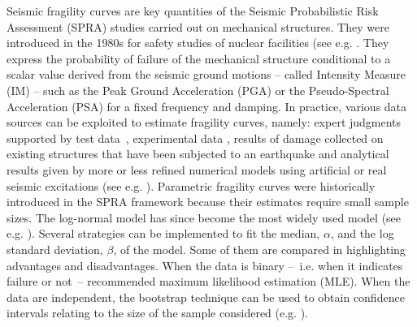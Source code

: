 Seismic fragility curves are key quantities of the Seismic Probabilistic Risk Assessment (SPRA) studies carried out on mechanical structures. They were introduced in the 1980s for safety studies of nuclear facilities (see e.g.
\cite{kennedy_probabilistic_1980,kennedy_seismic_1984,park_survey_1998,kennedy_risk_1999,cornell_hazard_2004}.
They express the probability of failure of the mechanical structure conditional to a scalar value derived from the seismic ground motions -- called Intensity Measure (IM) -- such as the Peak Ground Acceleration (PGA) or the Pseudo-Spectral Acceleration (PSA) for a fixed frequency and damping. In practice, various data sources can be exploited to estimate fragility curves, namely: expert judgments supported by test data \cite{kennedy_probabilistic_1980,kennedy_seismic_1984,park_survey_1998,zentner_fragility_2017}, experimental data \cite{park_survey_1998,gardoni_probabilistic_2002,choe_closed-form_2007}, results of damage collected on existing structures that have been subjected to an earthquake \citep{shinozuka_statistical_2000,lallemant_statistical_2015,straub_improved_2008}  and analytical results given by more or less refined numerical models using artificial or real seismic excitations (see e.g. \cite{zentner_numerical_2010,wang_influence_2020,mandal_seismic_2016,wang_seismic_2018,wang_bayesian_2018,zhao_seismic_2020}). Parametric fragility curves were historically introduced in the SPRA framework because their estimates require small sample sizes. The log-normal model has since become the most widely used model (see e.g. \cite{shinozuka_statistical_2000,lallemant_statistical_2015,straub_improved_2008,zentner_numerical_2010,wang_influence_2020,mandal_seismic_2016,wang_bayesian_2018,wang_seismic_2018,zhao_seismic_2020,ellingwood_earthquake_2001,kim_development_2004,mai_seismic_2017,trevlopoulos_parametric_2019,katayama_bayesian-estimation-based_2021}).
Several strategies can be implemented to fit the median, $\alpha$, and the log standard deviation, $\beta$, of the model. Some of them are compared in \cite{lallemant_statistical_2015} highlighting advantages and disadvantages.
When the data is binary --~i.e. when it indicates failure or not~-- \citet{lallemant_statistical_2015} recommended maximum likelihood estimation (MLE). When the data are independent, the bootstrap technique can be used to obtain confidence intervals relating to the size of the sample considered (e.g. \cite{shinozuka_statistical_2000,zentner_numerical_2010,wang_influence_2020}). 

